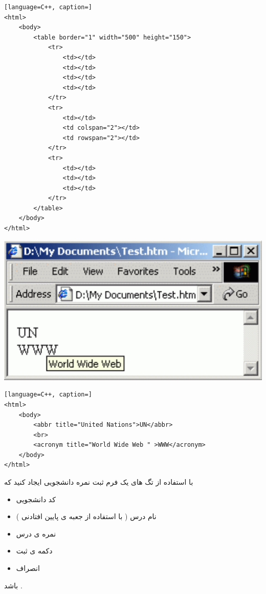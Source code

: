 \documentclass[12pt]{article}
\begin{document}
\begin{latin}
\begin{lstlisting}[language=C++, caption=]
<html>
	<body>
		<table border="1" width="500" height="150">
			<tr>
				<td></td>
				<td></td>
				<td></td>
				<td></td>
			</tr>
			<tr>
				<td></td>
				<td colspan="2"></td>
				<td rowspan="2"></td>
			</tr>
			<tr>
				<td></td>
				<td></td>
				<td></td>
			</tr>
		</table>
	</body>
</html>
\end{lstlisting}
\end{latin}



\newpage


\begin{center}
	\includegraphics[scale=0.6]{./4.png}
\end{center}


\begin{latin}
\begin{lstlisting}[language=C++, caption=]
<html>
	<body>
		<abbr title="United Nations">UN</abbr>
		<br>
		<acronym title="World Wide Web " >WWW</acronym>
	</body>
</html>
\end{lstlisting}
\end{latin}



\newpage

\vspace{20pt}

\noindent
با استفاده از تگ های 
یک فرم ثبت نمره دانشجویی ایجاد کنید که
\begin{itemize}
	\item کد دانشجویی
	\item نام درس ( با استفاده از جعبه ی پایین افتادنی )
	\item نمره ی درس
	\item دکمه ی ثبت
	\item انصراف
\end{itemize}
 باشد .
 
\end{document}
